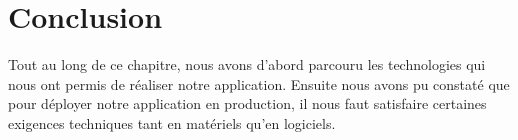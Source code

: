 \documentclass[12pt]{report}
\begin{document}
      \section{Conclusion}
	Tout au long de ce chapitre, nous avons d'abord parcouru les technologies qui nous ont permis de réaliser notre application. Ensuite nous avons pu constaté que pour déployer notre application en production, il nous faut satisfaire certaines exigences techniques tant en matériels qu'en logiciels.
	
  \lhead[]{} \rhead[]{} \chead[]{}
  

  \newpage
  

  \appendix
  
  
 
\end{document}
